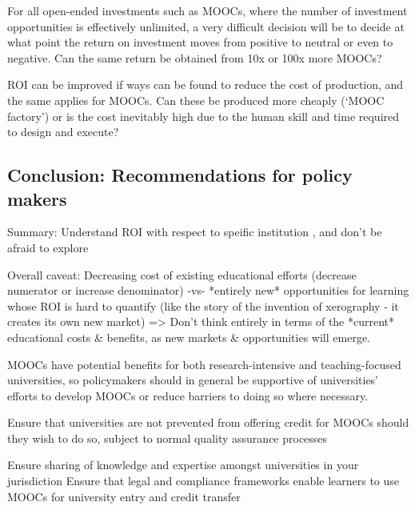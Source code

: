  
For all open-ended investments such as MOOCs, where the number of
investment opportunities is effectively unlimited, a very difficult
decision will be to decide at what point the return on investment moves
from positive to neutral or even to negative.  Can the same return be
obtained from 10x or 100x more MOOCs?
 
ROI can be improved if ways can be found to reduce the cost of
production, and the same applies for MOOCs.  Can these be produced more
cheaply (‘MOOC factory’) or is the cost inevitably high due to the human
skill and time required to design and execute?
 
\subsection{Conclusion: Recommendations for policy makers }

Summary: Understand ROI with respect to speific institution , and don't
be afraid to explore

Overall caveat: Decreasing cost of existing educational efforts
(decrease numerator or increase denominator)
-vs-
*entirely new* opportunities for learning whose ROI is hard to quantify
(like the story of the invention of xerography - it creates its own new
market) => Don't think entirely in terms of the *current* educational
costs \& benefits, as new markets \& opportunities will emerge.



MOOCs have potential benefits for both research-intensive and
teaching-focused universities, so policymakers should in general be
supportive of  universities' efforts to develop MOOCs
or reduce barriers to doing so where necessary.


 Ensure that universities are not
prevented from offering credit for MOOCs should they wish to do so,
subject to normal quality assurance processes 

Ensure sharing of
knowledge and expertise amongst universities in your jurisdiction Ensure
that legal and compliance frameworks enable learners to use MOOCs for
university entry and credit transfer
 

